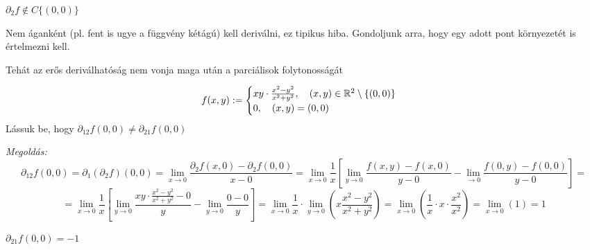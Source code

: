 \documentclass[a4paper,11.5pt]{article}
\begin{document}
	\begin{exercise}
		$\partial_2f\notin C\{(0,0)\}$
	\end{exercise}
	\begin{note}
		Nem áganként (pl. fent is ugye a függvény kétágú) kell deriválni, ez tipikus hiba. Gondoljunk arra, hogy egy adott pont környezetét is értelmezni kell.
	\end{note}
	\begin{note}
		Tehát az erős deriválhatóság nem vonja maga után a parciálisok folytonosságát
	\end{note}
	\begin{task}
		\[ f(x,y):=\begin{cases}
			xy\cdot\frac{x^2-y^2}{x^2+y^2},\quad (x,y)\in \mathbb{R}^2\setminus\{(0,0)\}\\
			0,\quad (x,y)=(0,0)
		\end{cases} \]
		Lássuk be, hogy $\partial_{12}f(0,0)\not=\partial_{21}f(0,0)$
		
		\textit{Megoldás:}
		\[ \partial_{12}f(0,0)=\partial_1(\partial_2f)(0,0)=\lim_{x\to0}\frac{\partial_2f(x,0)-\partial_2f(0,0)}{x-0}=\lim_{x\to0}\frac{1}{x}\left[\lim_{y\to0}\frac{f(x,y)-f(x,0)}{y-0}-\lim_{\to0}\frac{f(0,y)-f(0,0)}{y-0}\right]= \]
		\[= \lim_{x\to0}\frac{1}{x}\left[\lim_{y\to0}\frac{xy\cdot\frac{x^2-y^2}{x^2+y^2}-0}{y}-\lim_{y\to0}\frac{0-0}{y}\right]=\lim_{x\to0}\frac{1}{x}\cdot\lim_{y\to0}\left(x\frac{x^2-y^2}{x^2+y^2}\right)=\lim_{x\to0}\left(\frac{1}{x}\cdot x\cdot\frac{x^2}{x^2}\right)=\lim_{x\to0}(1)=1 \]
	\end{task}
	\begin{exercise}
		$\partial_{21}f(0,0)=-1$
	\end{exercise}
\end{document}
